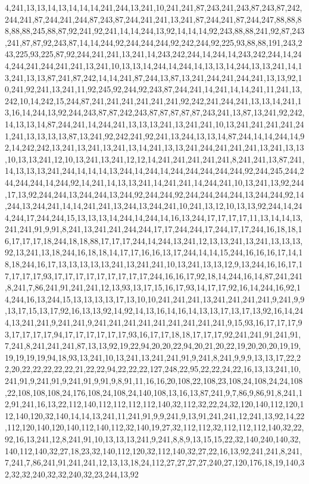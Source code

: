 4,241,13,13,14,13,14,14,14,241,244,13,241,10,241,241,87,243,241,243,87,243,87,242,244,241,87,244,241,244,87,243,87,244,241,241,13,241,87,244,241,87,244,247,88,88,88,88,88,245,88,87,92,241,92,241,14,14,244,13,92,14,14,14,92,243,88,88,241,92,87,243,241,87,87,92,243,87,14,14,244,92,244,244,244,92,242,244,92,225,93,88,88,191,243,243,225,93,225,87,92,244,241,241,13,241,14,243,242,244,14,244,14,243,242,244,14,244,244,241,244,241,241,13,241,10,13,13,14,244,14,244,14,13,13,14,244,13,13,241,14,13,241,13,13,87,241,87,242,14,14,241,87,244,13,87,13,241,244,241,244,241,13,13,92,10,241,92,241,13,241,11,92,245,92,244,92,243,87,244,241,14,241,14,14,241,11,241,13,242,10,14,242,15,244,87,241,241,241,241,241,241,92,242,241,244,241,13,13,14,241,13,16,14,244,13,92,244,243,87,87,242,243,87,87,87,87,87,243,241,13,87,13,241,92,242,14,13,13,14,87,244,241,14,244,241,13,13,13,241,13,241,241,10,13,241,241,241,241,241,241,13,13,13,13,87,13,241,92,242,241,92,241,13,244,13,13,14,87,244,14,14,244,14,92,14,242,242,13,241,13,241,13,241,13,14,241,13,13,241,244,241,241,241,13,241,13,13,10,13,13,241,12,10,13,241,13,241,12,12,14,241,241,241,241,241,8,241,241,13,87,241,14,13,13,13,241,244,14,14,14,13,244,14,244,14,244,244,244,244,244,92,244,245,244,244,244,244,14,244,92,14,241,14,13,13,241,14,241,241,14,244,241,10,13,241,13,92,244,17,13,92,244,244,13,244,244,13,244,92,244,244,92,244,244,244,244,13,244,244,92,14,244,13,244,241,14,14,241,241,13,244,13,244,241,10,241,13,12,10,13,13,92,244,14,244,244,17,244,244,15,13,13,13,14,244,14,244,14,16,13,244,17,17,17,17,11,13,14,14,13,241,241,91,9,91,8,241,13,241,241,244,244,17,17,244,244,17,244,17,17,244,16,18,18,16,17,17,17,18,244,18,18,88,17,17,17,244,14,244,13,241,12,13,13,241,13,241,13,13,13,92,13,241,13,18,244,16,18,18,14,17,17,16,16,13,17,244,14,14,15,244,16,16,16,17,14,18,18,244,16,17,13,13,13,13,13,241,13,241,241,10,13,241,13,13,12,9,13,244,16,16,17,17,17,17,17,93,17,17,17,17,17,17,17,17,17,244,16,16,17,92,18,14,244,16,14,87,241,241,8,241,7,86,241,91,241,241,12,13,93,13,17,15,16,17,93,14,17,17,92,16,14,244,16,92,14,244,16,13,244,15,13,13,13,13,17,13,10,10,241,241,241,13,241,241,241,241,9,241,9,9,13,17,15,13,17,92,16,13,13,92,14,92,14,13,16,14,16,14,13,13,17,13,17,13,92,16,14,244,13,241,241,9,241,241,9,241,241,241,241,241,241,241,241,241,9,15,93,16,17,17,17,93,17,17,17,17,94,17,17,17,17,17,17,93,16,17,17,18,18,17,17,17,92,241,241,91,241,91,7,241,8,241,241,241,87,13,13,92,19,22,94,20,20,22,94,20,21,20,22,19,20,20,20,19,19,19,19,19,19,94,18,93,13,241,10,13,241,13,241,241,91,9,241,8,241,9,9,9,13,13,17,22,22,20,22,22,22,22,22,21,22,22,94,22,22,22,127,248,22,95,22,22,24,22,16,13,13,241,10,241,91,9,241,91,9,241,91,9,91,9,8,91,11,16,16,20,108,22,108,23,108,24,108,24,24,108,22,108,108,108,24,176,108,24,108,24,140,108,13,16,13,87,241,9,7,86,9,86,91,8,241,12,91,241,16,13,22,112,140,112,112,112,112,140,32,112,32,22,24,32,120,140,112,120,112,140,120,32,140,14,14,13,241,11,241,91,9,9,241,9,13,91,241,241,12,241,13,92,14,22,112,120,140,120,140,112,140,112,32,140,19,27,32,112,112,32,112,112,112,140,32,22,92,16,13,241,12,8,241,91,10,13,13,13,241,9,241,8,8,9,13,15,15,22,32,140,240,140,32,140,112,140,32,27,18,23,32,140,112,120,32,112,140,32,27,22,16,13,92,241,241,8,241,7,241,7,86,241,91,241,241,12,13,13,18,24,112,27,27,27,27,240,27,120,176,18,19,140,32,32,32,240,32,32,240,32,23,244,13,92